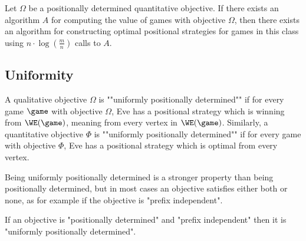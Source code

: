 \begin{lemma}
\label{1-lem:constructing_winning_strategy_quantitative}
Let $\Omega$ be a positionally determined quantitative objective.
If there exists an algorithm $A$ for computing the value of games with objective $\Omega$,
then there exists an algorithm for constructing optimal positional strategies for games in this class 
using $n \cdot \log(\frac{m}{n})$ calls to $A$.
\end{lemma}

\subsection*{Uniformity}
A qualitative objective $\Omega$ is ""uniformly positionally determined"" if for every game $\game$ with objective $\Omega$, 
Eve has a positional strategy which is winning from $\WE(\game)$, meaning from every vertex in $\WE(\game)$.
Similarly, a quantitative objective $\Phi$ is ""uniformly positionally determined"" if for every game with objective $\Phi$, 
Eve has a positional strategy which is optimal from every vertex.

Being uniformly positionally determined is a stronger property than being positionally determined, but in most cases an objective satisfies either both or none, as for example if the objective is "prefix independent".

\begin{lemma}
\label{1-lem:from_positional_to_uniformly_positional}
If an objective is "positionally determined" and "prefix independent" then it is "uniformly positionally determined".
\end{lemma}

